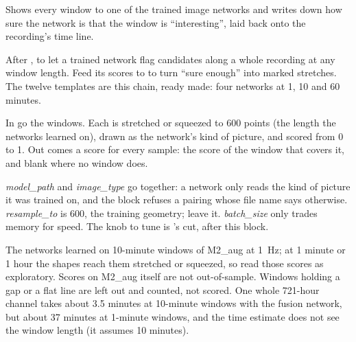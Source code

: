 Shows every window to one of the trained image networks and writes down how sure the network
is that the window is ``interesting'', laid back onto the recording's time line.

After , to let a trained network flag candidates
along a whole recording at any window length. Feed its scores to 
to turn ``sure enough'' into marked stretches. The twelve  templates
are this chain, ready made: four networks at 1, 10 and 60 minutes.

In go the windows. Each is stretched or squeezed to 600 points (the length the networks
learned on), drawn as the network's kind of picture, and scored from 0 to 1. Out comes a
score for every sample: the score of the window that covers it, and blank where no window
does.

\emph{model\_path} and \emph{image\_type} go together: a network only reads the kind of
picture it was trained on, and the block refuses a pairing whose file name says otherwise.
\emph{resample\_to} is 600, the training geometry; leave it. \emph{batch\_size} only trades
memory for speed. The knob to tune is 's cut, after this block.

The networks learned on 10-minute windows of M2\_aug at 1~Hz; at 1 minute or 1 hour the
shapes reach them stretched or squeezed, so read those scores as exploratory. Scores on
M2\_aug itself are not out-of-sample. Windows holding a gap or a flat line are left out and
counted, not scored. One whole 721-hour channel takes about 3.5 minutes at 10-minute windows
with the fusion network, but about 37 minutes at 1-minute windows, and the time estimate does
not see the window length (it assumes 10 minutes).
